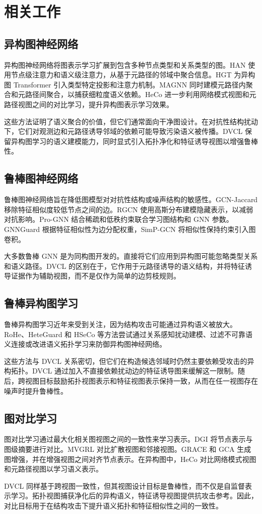 \section{相关工作}
\label{sec:related-work-zh}

\subsection{异构图神经网络}

异构图神经网络将图表示学习扩展到包含多种节点类型和关系类型的图。HAN 使用节点级注意力和语义级注意力，从基于元路径的邻域中聚合信息。HGT 为异构图 Transformer 引入类型特定投影和注意力机制。MAGNN 同时建模元路径内聚合和元路径间聚合，以捕获细粒度语义依赖。HeCo 进一步利用网络模式视图和元路径视图之间的对比学习，提升异构图表示学习效果。

这些方法证明了语义聚合的价值，但它们通常面向干净图设计。在对抗性结构扰动下，它们对观测边和元路径诱导邻域的依赖可能导致污染语义被传播。DVCL 保留异构图学习的语义建模能力，同时显式引入拓扑净化和特征诱导视图以增强鲁棒性。

\subsection{鲁棒图神经网络}

鲁棒图神经网络旨在降低图模型对对抗性结构或噪声结构的敏感性。GCN-Jaccard 移除特征相似度较低节点之间的边。RGCN 使用高斯分布建模隐藏表示，以减弱对抗影响。Pro-GNN 结合稀疏和低秩约束联合学习图结构和 GNN 参数。GNNGuard 根据特征相似性为边分配权重，SimP-GCN 将相似性保持约束引入图卷积。

大多数鲁棒 GNN 是为同构图开发的。直接将它们应用到异构图可能忽略类型关系和语义路径。DVCL 的区别在于，它作用于元路径诱导的语义结构，并将特征诱导证据作为辅助视图，而不是仅作为简单的边剪枝规则。

\subsection{鲁棒异构图学习}

鲁棒异构图学习近年来受到关注，因为结构攻击可能通过异构语义被放大。RoHe、HeteGuard 和 HSeCo 等方法尝试通过关系感知扰动建模、过滤不可靠语义连接或改进语义拓扑学习来防御异构图神经网络。

这些方法与 DVCL 关系密切，但它们在构造候选邻域时仍然主要依赖受攻击的异构拓扑。DVCL 通过加入不直接依赖扰动边的特征诱导图来缓解这一限制。随后，跨视图目标鼓励拓扑视图表示和特征视图表示保持一致，从而在任一视图存在噪声时提升鲁棒性。

\subsection{图对比学习}

图对比学习通过最大化相关图视图之间的一致性来学习表示。DGI 将节点表示与图级摘要进行对比。MVGRL 对比扩散视图和邻接视图。GRACE 和 GCA 生成图增强，并在增强视图之间对齐节点表示。在异构图中，HeCo 对比网络模式视图和元路径视图以学习语义表示。

DVCL 同样基于跨视图一致性，但其视图设计目标是鲁棒性，而不仅是自监督表示学习。拓扑视图捕获净化后的异构语义，特征诱导视图提供抗攻击参考。因此，对比目标用于在结构攻击下提升语义拓扑和特征相似性之间的一致性。
